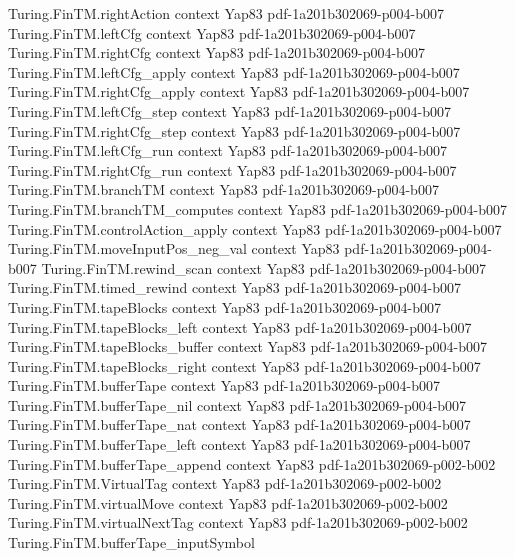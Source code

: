 \begin{theorem}
\proofstep
  {Turing.FinTM.rightAction}
  {context}
  {Yap83}
  {pdf-1a201b302069-p004-b007}
\proofstep
  {Turing.FinTM.leftCfg}
  {context}
  {Yap83}
  {pdf-1a201b302069-p004-b007}
\proofstep
  {Turing.FinTM.rightCfg}
  {context}
  {Yap83}
  {pdf-1a201b302069-p004-b007}
\proofstep
  {Turing.FinTM.leftCfg_apply}
  {context}
  {Yap83}
  {pdf-1a201b302069-p004-b007}
\proofstep
  {Turing.FinTM.rightCfg_apply}
  {context}
  {Yap83}
  {pdf-1a201b302069-p004-b007}
\proofstep
  {Turing.FinTM.leftCfg_step}
  {context}
  {Yap83}
  {pdf-1a201b302069-p004-b007}
\proofstep
  {Turing.FinTM.rightCfg_step}
  {context}
  {Yap83}
  {pdf-1a201b302069-p004-b007}
\proofstep
  {Turing.FinTM.leftCfg_run}
  {context}
  {Yap83}
  {pdf-1a201b302069-p004-b007}
\proofstep
  {Turing.FinTM.rightCfg_run}
  {context}
  {Yap83}
  {pdf-1a201b302069-p004-b007}
\proofstep
  {Turing.FinTM.branchTM}
  {context}
  {Yap83}
  {pdf-1a201b302069-p004-b007}
\proofstep
  {Turing.FinTM.branchTM_computes}
  {context}
  {Yap83}
  {pdf-1a201b302069-p004-b007}
\proofstep
  {Turing.FinTM.controlAction_apply}
  {context}
  {Yap83}
  {pdf-1a201b302069-p004-b007}
\proofstep
  {Turing.FinTM.moveInputPos_neg_val}
  {context}
  {Yap83}
  {pdf-1a201b302069-p004-b007}
\proofstep
  {Turing.FinTM.rewind_scan}
  {context}
  {Yap83}
  {pdf-1a201b302069-p004-b007}
\proofstep
  {Turing.FinTM.timed_rewind}
  {context}
  {Yap83}
  {pdf-1a201b302069-p004-b007}
\proofstep
  {Turing.FinTM.tapeBlocks}
  {context}
  {Yap83}
  {pdf-1a201b302069-p004-b007}
\proofstep
  {Turing.FinTM.tapeBlocks_left}
  {context}
  {Yap83}
  {pdf-1a201b302069-p004-b007}
\proofstep
  {Turing.FinTM.tapeBlocks_buffer}
  {context}
  {Yap83}
  {pdf-1a201b302069-p004-b007}
\proofstep
  {Turing.FinTM.tapeBlocks_right}
  {context}
  {Yap83}
  {pdf-1a201b302069-p004-b007}
\proofstep
  {Turing.FinTM.bufferTape}
  {context}
  {Yap83}
  {pdf-1a201b302069-p004-b007}
\proofstep
  {Turing.FinTM.bufferTape_nil}
  {context}
  {Yap83}
  {pdf-1a201b302069-p004-b007}
\proofstep
  {Turing.FinTM.bufferTape_nat}
  {context}
  {Yap83}
  {pdf-1a201b302069-p004-b007}
\proofstep
  {Turing.FinTM.bufferTape_left}
  {context}
  {Yap83}
  {pdf-1a201b302069-p004-b007}
\proofstep
  {Turing.FinTM.bufferTape_append}
  {context}
  {Yap83}
  {pdf-1a201b302069-p002-b002}
\proofstep
  {Turing.FinTM.VirtualTag}
  {context}
  {Yap83}
  {pdf-1a201b302069-p002-b002}
\proofstep
  {Turing.FinTM.virtualMove}
  {context}
  {Yap83}
  {pdf-1a201b302069-p002-b002}
\proofstep
  {Turing.FinTM.virtualNextTag}
  {context}
  {Yap83}
  {pdf-1a201b302069-p002-b002}
\proofstep
  {Turing.FinTM.bufferTape_inputSymbol}

\end{theorem}
